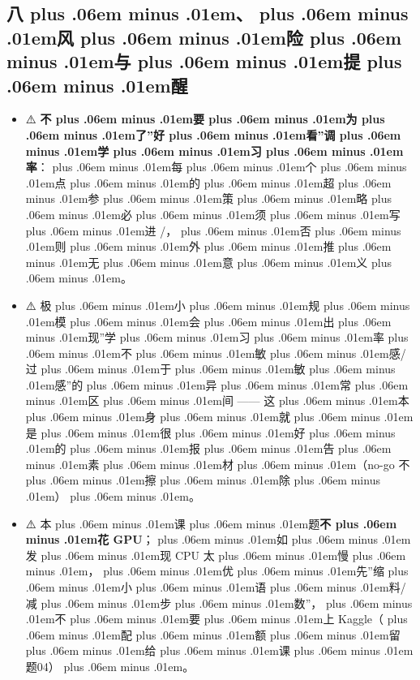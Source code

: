\documentclass[
]{article}
\newcommand{\passthrough}[1]{#1}
\providecommand{\tightlist}{%
  \setlength{\itemsep}{0pt}\setlength{\parskip}{0pt}}
\def\zh#1{{\zhfont #1}}
\def\sym#1{{\symfont #1}}
\def\codezh#1{{\zhmonofont #1}}
\def\zhglue{\hskip0pt plus .06em minus .01em}
\begin{document}
\subsection{\zh{八\zhglue 、\zhglue 风\zhglue 险\zhglue 与\zhglue 提\zhglue 醒}}\label{ux516bux98ceux9669ux4e0eux63d0ux9192}

\begin{itemize}
\tightlist
\item
  \sym{⚠️} \textbf{\zh{不\zhglue 要\zhglue 为\zhglue 了}''\zh{好\zhglue 看}''\zh{调\zhglue 学\zhglue 习\zhglue 率}}\zh{：\zhglue 每\zhglue 个\zhglue 点\zhglue 的\zhglue 超\zhglue 参\zhglue 策\zhglue 略\zhglue 必\zhglue 须\zhglue 写\zhglue 进} \passthrough{\codezh{{\zh{证}}{\zh{据}}/}}\zh{，\zhglue 否\zhglue 则\zhglue 外\zhglue 推\zhglue 无\zhglue 意\zhglue 义\zhglue 。}
\item
  \sym{⚠️} \zh{极\zhglue 小\zhglue 规\zhglue 模\zhglue 会\zhglue 出\zhglue 现}''\zh{学\zhglue 习\zhglue 率\zhglue 不\zhglue 敏\zhglue 感}/\zh{过\zhglue 于\zhglue 敏\zhglue 感}''\zh{的\zhglue 异\zhglue 常\zhglue 区\zhglue 间} ------ \zh{这\zhglue 本\zhglue 身\zhglue 就\zhglue 是\zhglue 很\zhglue 好\zhglue 的\zhglue 报\zhglue 告\zhglue 素\zhglue 材\zhglue （}no-go \zh{不\zhglue 擦\zhglue 除\zhglue ）\zhglue 。}
\item
  \sym{⚠️} \zh{本\zhglue 课\zhglue 题}\textbf{\zh{不\zhglue 花} GPU}\zh{；\zhglue 如\zhglue 发\zhglue 现} CPU \zh{太\zhglue 慢\zhglue ，\zhglue 优\zhglue 先}''\zh{缩\zhglue 小\zhglue 语\zhglue 料}/\zh{减\zhglue 步\zhglue 数}''\zh{，\zhglue 不\zhglue 要\zhglue 上} Kaggle\zh{（\zhglue 配\zhglue 额\zhglue 留\zhglue 给\zhglue 课\zhglue 题}04\zh{）\zhglue 。}
\end{itemize}
\end{document}
